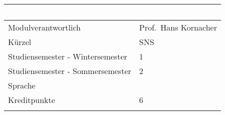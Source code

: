 \begin{longtable}[]{@{}ll@{}}
\toprule
\begin{minipage}[b]{0.12\columnwidth}\raggedright\strut
~\strut
\end{minipage} & \begin{minipage}[b]{0.12\columnwidth}\raggedright\strut
~\strut
\end{minipage}\tabularnewline
\midrule
\endhead
\begin{minipage}[t]{0.12\columnwidth}\raggedright\strut
Modulverantwortlich\strut
\end{minipage} & \begin{minipage}[t]{0.12\columnwidth}\raggedright\strut
Prof.~Hans Kornacher\strut
\end{minipage}\tabularnewline
\begin{minipage}[t]{0.12\columnwidth}\raggedright\strut
Kürzel\strut
\end{minipage} & \begin{minipage}[t]{0.12\columnwidth}\raggedright\strut
SNS\strut
\end{minipage}\tabularnewline
\begin{minipage}[t]{0.12\columnwidth}\raggedright\strut
Studiensemester - Wintersemester\strut
\end{minipage} & \begin{minipage}[t]{0.12\columnwidth}\raggedright\strut
1\strut
\end{minipage}\tabularnewline
\begin{minipage}[t]{0.12\columnwidth}\raggedright\strut
Studiensemester - Sommersemester\strut
\end{minipage} & \begin{minipage}[t]{0.12\columnwidth}\raggedright\strut
2\strut
\end{minipage}\tabularnewline
\begin{minipage}[t]{0.12\columnwidth}\raggedright\strut
Sprache\strut
\end{minipage} & \begin{minipage}[t]{0.12\columnwidth}\raggedright\strut
~\strut
\end{minipage}\tabularnewline
\begin{minipage}[t]{0.12\columnwidth}\raggedright\strut
Kreditpunkte\strut
\end{minipage} & \begin{minipage}[t]{0.12\columnwidth}\raggedright\strut
6\strut
\end{minipage}\tabularnewline
\begin{minipage}[t]{0.12\columnwidth}\raggedright\strut

\end{minipage}
\end{longtable}
